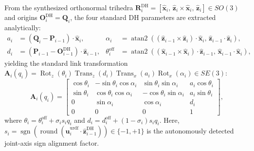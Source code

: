 \documentclass[fleqn,10pt]{article}
\begin{document}
	From the synthesized orthonormal trihedra $\bm{R}_i^{\text{DH}} = [\hat{\bm{x}}_i, \, \hat{\bm{z}}_i \times \hat{\bm{x}}_i, \, \hat{\bm{z}}_i] \in SO(3)$ and origins $\bm{O}_i^{\text{DH}} = \bm{Q}_i$, the four standard DH parameters are extracted analytically:
	\begin{align}
		a_i &= (\bm{Q}_i - \bm{P}_{i-1}) \cdot \hat{\bm{x}}_i, & \alpha_i &= \operatorname{atan2}\!\left( (\hat{\bm{z}}_{i-1} \times \hat{\bm{z}}_i) \cdot \hat{\bm{x}}_i, \, \hat{\bm{z}}_{i-1} \cdot \hat{\bm{z}}_i \right), \label{eq:dh_a_alpha} \\
		d_i &= (\bm{P}_{i-1} - \bm{O}_{i-1}^{\text{DH}}) \cdot \hat{\bm{z}}_{i-1}, & \theta_i^{\text{off}} &= \operatorname{atan2}\!\left( (\hat{\bm{x}}_{i-1} \times \hat{\bm{x}}_i) \cdot \hat{\bm{z}}_{i-1}, \, \hat{\bm{x}}_{i-1} \cdot \hat{\bm{x}}_i \right), \label{eq:dh_d_theta}
	\end{align}
	yielding the standard link transformation $\bm{A}_i(q_i) = \operatorname{Rot}_z(\theta_i)\operatorname{Trans}_z(d_i)\operatorname{Trans}_x(a_i)\operatorname{Rot}_x(\alpha_i) \in SE(3)$:
	\begin{equation}
		\bm{A}_i(q_i) = \begin{bmatrix}
			\cos\theta_i & -\sin\theta_i\cos\alpha_i & \sin\theta_i\sin\alpha_i & a_i\cos\theta_i \\
			\sin\theta_i & \cos\theta_i\cos\alpha_i & -\cos\theta_i\sin\alpha_i & a_i\sin\theta_i \\
			0 & \sin\alpha_i & \cos\alpha_i & d_i \\
			0 & 0 & 0 & 1
		\end{bmatrix},
		\label{eq:dh_matrix}
	\end{equation}
	where $\theta_i = \theta_i^{\text{off}} + \sigma_i s_i q_i$ and $d_i = d_i^{\text{off}} + (1-\sigma_i) s_i q_i$. Here, $s_i = \operatorname{sgn}(\operatorname{round}(\hat{\bm{u}}_i^{\text{urdf}} \cdot \hat{\bm{z}}_{i-1}^{\text{DH}})) \in \{-1, +1\}$ is the autonomously detected joint-axis sign alignment factor.
	
\end{document}
